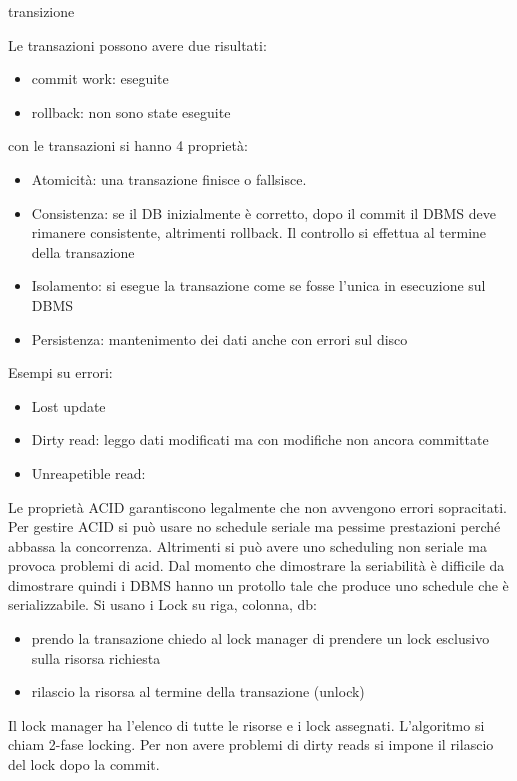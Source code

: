 \begin{definizione}
    transizione
\end{definizione}
Le transazioni possono avere due risultati:
\begin{itemize}
    \item commit work: eseguite
    \item rollback: non sono state eseguite
\end{itemize}

con le transazioni si hanno 4 proprietà:
\begin{itemize}
    \item Atomicità: una transazione finisce o fallsisce.
    \item Consistenza: se il DB inizialmente è corretto, dopo il commit il DBMS
          deve rimanere consistente, altrimenti rollback. Il controllo si effettua al
          termine della transazione
    \item Isolamento: si esegue la transazione come se fosse l'unica in esecuzione
          sul DBMS
    \item Persistenza: mantenimento dei dati anche con errori sul disco
\end{itemize}

Esempi su errori:
\begin{itemize}
    \item Lost update
    \item Dirty read: leggo dati modificati ma con modifiche non ancora committate
    \item Unreapetible read:
\end{itemize}
Le proprietà ACID garantiscono legalmente che non avvengono errori sopracitati.
Per gestire ACID si può usare no schedule seriale ma pessime prestazioni perché
abbassa la concorrenza. Altrimenti si può avere uno scheduling non seriale ma provoca
problemi di acid. Dal momento che dimostrare la seriabilità è difficile da dimostrare
quindi i DBMS hanno un protollo tale che produce uno schedule che è serializzabile.
Si usano i Lock su riga, colonna, db:
\begin{itemize}
    \item prendo la transazione chiedo al lock manager di prendere un lock esclusivo sulla
          risorsa richiesta
    \item rilascio la risorsa al termine della transazione (unlock)
\end{itemize}
Il lock manager ha l'elenco di tutte le risorse e i lock assegnati. L'algoritmo
si chiam 2-fase locking. Per non avere problemi di dirty reads si impone il rilascio
del lock dopo la commit.

